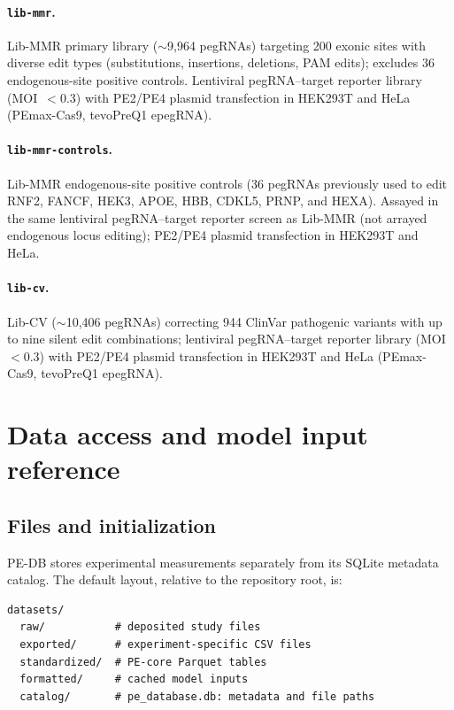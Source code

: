 \documentclass{article}
\begin{document}
\paragraph{\nolinkurl{lib-mmr}.}
Lib-MMR primary library (${\sim}$9,964 pegRNAs) targeting 200 exonic sites with diverse edit types (substitutions, insertions, deletions, PAM edits); excludes 36 endogenous-site positive controls. Lentiviral pegRNA--target reporter library (MOI~$<0.3$) with PE2/PE4 plasmid transfection in HEK293T and HeLa (PEmax-Cas9, tevoPreQ1 epegRNA).

\paragraph{\nolinkurl{lib-mmr-controls}.}
Lib-MMR endogenous-site positive controls (36 pegRNAs previously used to edit RNF2, FANCF, HEK3, APOE, HBB, CDKL5, PRNP, and HEXA). Assayed in the same lentiviral pegRNA--target reporter screen as Lib-MMR (not arrayed endogenous locus editing); PE2/PE4 plasmid transfection in HEK293T and HeLa.

\paragraph{\nolinkurl{lib-cv}.}
Lib-CV (${\sim}$10,406 pegRNAs) correcting 944 ClinVar pathogenic variants with up to nine silent edit combinations; lentiviral pegRNA--target reporter library (MOI~$<0.3$) with PE2/PE4 plasmid transfection in HEK293T and HeLa (PEmax-Cas9, tevoPreQ1 epegRNA).

\section{Data access and model input reference}
\label{app:api}

\subsection{Files and initialization}

PE-DB stores experimental measurements separately from its SQLite metadata catalog. The default layout, relative to the repository root, is:

\begin{verbatim}
datasets/
  raw/           # deposited study files
  exported/      # experiment-specific CSV files
  standardized/  # PE-core Parquet tables
  formatted/     # cached model inputs
  catalog/       # pe_database.db: metadata and file paths
\end{verbatim}
\end{document}
